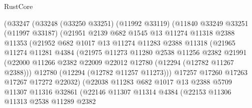 \begin{lexlean}{RustCore}
\begin{coremodule}
                  (@33247
                    (@33248
                      (@33250 @33251)
                      (@11992 @33119)
                      (@11840
                        @33249
                        @33251
                        (@11997 @33187)
                        (@21951
                          @2139
                          @682
                          @1545
                          @13
                          @11274
                          @11318
                          @2388
                          @11353
                          (@21952
                            @682
                            @1017
                            @13
                            @11274
                            @11283
                            @2388
                            @11318
                            (@21965
                              @11274
                              @11281
                              @4384
                              (@21975
                                @11273
                                @11280
                                @2538
                                @11256
                                @2382
                                @21991
                                (@22000
                                  @11266
                                  @2382
                                  @22009
                                  @22012
                                  @12780
                                  (@12294 (@12782 @11267 @2388)))
                                @12780
                                (@12294 (@12782 @11257 @11273)))
                              @17257
                              @17260
                              @17263
                              @17267
                              @17272
                              @22032)
                            (@22038
                              @11283
                              @682
                              @1017
                              @13
                              @2388
                              @5709
                              @11307
                              @11316
                              @32861
                              (@22146
                                @11307
                                @11314
                                @4384
                                (@22153
                                  @11306
                                  @11313
                                  @2538
                                  @11289
                                  @2382

\end{coremodule}
\end{lexlean}
